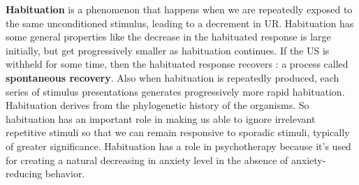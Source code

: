 \documentclass[11pt]{article}
\begin{document}
\textbf{Habituation} is a phenomenon that happens when we are repeatedly exposed to the same unconditioned stimulus, leading to a decrement in UR. Habituation has some general properties like the decrease in the habituated response is large initially, but get progressively smaller as habituation continues. If the US is withheld for some time, then the habituated response recovers : a process called \textbf{spontaneous recovery}. Also when habituation is repeatedly produced, each series of stimulus presentations generates progressively more rapid habituation. Habituation derives from the phylogenetic history of the organisms. So habituation has an important role in making us able to ignore irrelevant repetitive stimuli so that we can remain responsive to sporadic stimuli, typically of greater significance. Habituation has a role in psychotherapy because it's used for creating a natural decreasing in anxiety level in the absence of anxiety-reducing behavior.
\end{document}
